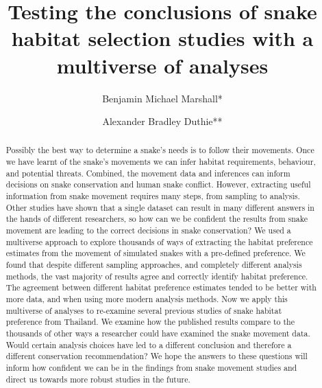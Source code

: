 \documentclass[10pt,a4paper]{article}
\begin{document}
\pagestyle{fancy}

\title{Testing the conclusions of snake habitat selection studies with a multiverse of analyses}
\author[1]{Benjamin Michael Marshall*}
\author[1]{Alexander Bradley Duthie**}


\maketitle
\thispagestyle{fancy}

\begin{abstract}

Possibly the best way to determine a snake's needs is to follow their movements. Once we have learnt of the snake's movements we can infer habitat requirements, behaviour, and potential threats. Combined, the movement data and inferences can inform decisions on snake conservation and human snake conflict. However, extracting useful information from snake movement requires many steps, from sampling to analysis. Other studies have shown that a single dataset can result in many different answers in the hands of different researchers, so how can we be confident the results from snake movement are leading to the correct decisions in snake conservation? We used a multiverse approach to explore thousands of ways of extracting the habitat preference estimates from the movement of simulated snakes with a pre-defined preference. We found that despite different sampling approaches, and completely different analysis methods, the vast majority of results agree and correctly identify habitat preference. The agreement between different habitat preference estimates tended to be better with more data, and when using more modern analysis methods. Now we apply this multiverse of analyses to re-examine several previous studies of snake habitat preference from Thailand. We examine how the published results compare to the thousands of other ways a researcher could have examined the snake movement data. Would certain analysis choices have led to a different conclusion and therefore a different conservation recommendation? We hope the answers to these questions will inform how confident we can be in the findings from snake movement studies and direct us towards more robust studies in the future.

\end{abstract}
\end{document}

